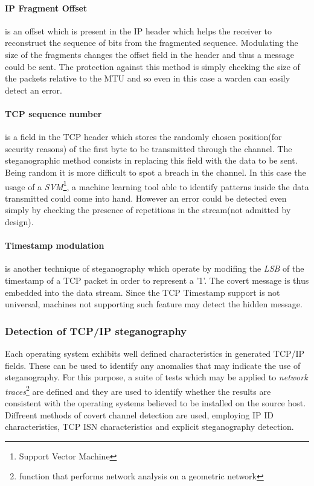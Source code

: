 \documentclass[../../main.tex]{subfiles}
\begin{document}
    \paragraph{IP Fragment Offset} is an offset which is present in the IP
    header which helps the receiver to reconstruct the sequence of bits from the
    fragmented sequence.
    Modulating the size of the fragments changes the offset field in the header
    and thus a message could be sent.
    The protection against this method is simply checking the size of the
    packets relative to the MTU and so even in this case a warden can easily
    detect an error.

    \paragraph{TCP sequence number} is a field in the TCP header which stores
    the randomly chosen position(for security reasons) of the first byte to be
    transmitted through the channel. The steganographic method consists in
    replacing this field with the data to be sent.
    Being random it is more difficult to spot a breach in the channel.
    In this case the usage of a \emph{SVM}\footnote{Support Vector Machine}, a
    machine learning tool able to identify patterns inside the data transmitted
    could come into hand.
    However an error could be detected even simply by checking the presence of
    repetitions in the stream(not admitted by design). 

    \paragraph{Timestamp modulation} is another technique of steganography which
    operate by modifing the \emph{LSB} of the
    timestamp of a TCP packet in order to represent a '1'.
    The covert message is thus embedded into the data stream.
    Since the TCP Timestamp support is not universal, machines not supporting
    such feature may detect the hidden message.


    \subsubsection{Detection of TCP/IP steganography}

    Each operating system exhibits well defined characteristics in generated
    TCP/IP fields. These can be used to identify any anomalies that may indicate 
    the use of steganography. For this purpose, a suite of tests which may be
    applied to \emph{network traces}\footnote{function that performs network
    analysis on a geometric network} are defined and they are used to identify
    whether the results are consistent with the operating systems believed to be
    installed on the source host.
    Diffreent methods of covert channel detection are used, employing IP ID 
    characteristics, TCP ISN characteristics and explicit steganography
    detection.
\end{document}
